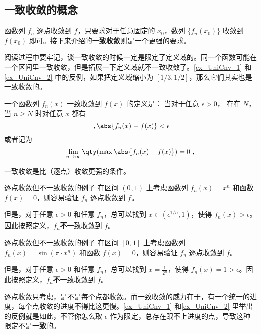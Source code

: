 



\subsection{一致收敛的概念}

函数列 $f_n$ 逐点收敛到 $f$，只要求对于任意固定的 $x_0$，数列 $\{f_n(x_0)\}$ 收敛到 $f(x_0)$ 即可。接下来介绍的\textbf{一致收敛}则是一个更强的要求。

阅读过程中要牢记，谈一致收敛的时候一定是限定了定义域的。同一个函数可能在一个区间里一致收敛，但是拓展一下定义域就不一致收敛了。\autoref{ex_UniCnv_1} 和\autoref{ex_UniCnv_2} 中的反例，如果把定义域缩小为 $[1/3, 1/2]$，那么它们其实也是一致收敛的。

一个函数列 $f_n(x)$ 一致收敛到 $f(x)$ 的定义是： 当对于任意 $\epsilon > 0$， 存在 $N$， 当 $n \geqslant N$ 时对任意 $x$ 都有
\begin{equation}\label{eq_UniCnv_1}~,
\abs{f_n(x) - f(x)} < \epsilon
\end{equation}
或者记为
\begin{equation}
\lim_{n\to\infty} \qty(\max \abs{f_n(x) - f(x)}) = 0~,
\end{equation}

一致收敛是比（逐点）收敛更强的条件。

\begin{example}{逐点收敛但不一致收敛的例子}\label{ex_UniCnv_1}
在区间 $(0, 1)$ 上考虑函数列 $f_n(x)=x^n$ 和函数 $f(x)=0$，则容易验证 $f_n$ 逐点收敛到 $f$。

但是，对于任意 $\epsilon>0$ 和任意 $f_n$，总可以找到 $x\in(\epsilon^{1/n}, 1)$，使得 $f_n(x)>\epsilon$。因此按照定义，$f_n$\textbf{不}一致收敛到 $f$。

\end{example}

\begin{example}{逐点收敛但不一致收敛的例子}\label{ex_UniCnv_2}
在区间 $[0, 1]$ 上考虑函数列 $f_n(x)=\sin(\pi\cdot x^n)$ 和函数 $f(x)=0$，则容易验证 $f_n$ 逐点收敛到 $f$。

但是，对于任意 $\epsilon>0$ 和任意 $f_n$，总可以找到 $x=\frac{1}{2^n}$，使得 $f_n(x)=1>\epsilon$。因此按照定义，$f_n$\textbf{不}一致收敛到 $f$。

\end{example}

逐点收敛只考虑，是不是每个点都收敛。而一致收敛的威力在于，有一个统一的进度，每个点收敛的进度不得比这更慢。\autoref{ex_UniCnv_1} 和\autoref{ex_UniCnv_2} 里举出的反例就是如此，不管你怎么取 $\epsilon$ 作为限定，总存在跟不上进度的点，导致这种限定不是\textbf{一致}的。

